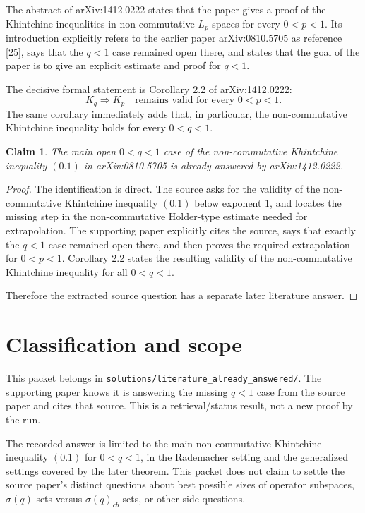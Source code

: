 \documentclass[11pt]{article}
\newtheorem*{claim}{Claim}
\begin{document}
The abstract of arXiv:1412.0222 states that the paper gives a proof of the
Khintchine inequalities in non-commutative \(L_p\)-spaces for every
\(0<p<1\). Its introduction explicitly refers to the earlier paper
arXiv:0810.5705 as reference [25], says that the \(q<1\) case remained open
there, and states that the goal of the paper is to give an explicit estimate
and proof for \(q<1\).

The decisive formal statement is Corollary 2.2 of arXiv:1412.0222:
\[
K_q \Rightarrow K_p \quad \text{remains valid for every } 0<p<1.
\]
The same corollary immediately adds that, in particular, the non-commutative
Khintchine inequality holds for every \(0<q<1\).

\begin{claim}
The main open \(0<q<1\) case of the non-commutative Khintchine inequality
\((0.1)\) in arXiv:0810.5705 is already answered by arXiv:1412.0222.
\end{claim}

\begin{proof}
The identification is direct. The source asks for the validity of the
non-commutative Khintchine inequality \((0.1)\) below exponent \(1\), and
locates the missing step in the non-commutative Holder-type estimate needed
for extrapolation. The supporting paper explicitly cites the source, says
that exactly the \(q<1\) case remained open there, and then proves the
required extrapolation for \(0<p<1\). Corollary 2.2 states the resulting
validity of the non-commutative Khintchine inequality for all \(0<q<1\).

Therefore the extracted source question has a separate later literature
answer.
\end{proof}

\section*{Classification and scope}

This packet belongs in
\texttt{solutions/literature\_already\_answered/}. The supporting paper knows
it is answering the missing \(q<1\) case from the source paper and cites that
source. This is a retrieval/status result, not a new proof by the run.

The recorded answer is limited to the main non-commutative Khintchine
inequality \((0.1)\) for \(0<q<1\), in the Rademacher setting and the
generalized settings covered by the later theorem. This packet does not claim
to settle the source paper's distinct questions about best possible sizes of
operator subspaces, \(\sigma(q)\)-sets versus \(\sigma(q)_{cb}\)-sets, or
other side questions.
\end{document}
